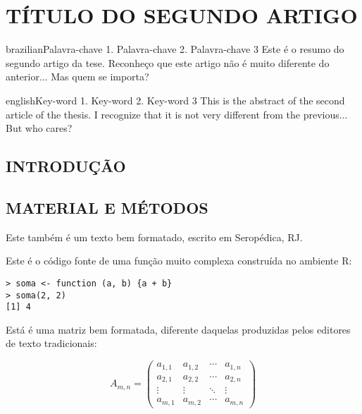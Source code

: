 \artigotrue
\chapter{TÍTULO DO SEGUNDO ARTIGO}
\label{chap:chapter01}

\begin{chapterabstract}{brazilian}{Palavra-chave 1. Palavra-chave 2. Palavra-chave 3}
Este é o resumo do segundo artigo da tese. Reconheço que este artigo não é muito
diferente do anterior... Mas quem se importa?
\end{chapterabstract}

\begin{chapterabstract}{english}{Key-word 1. Key-word 2. Key-word 3}
This is the abstract of the second article of the thesis. I recognize that it is
not very different from the previous... But who cares?
\end{chapterabstract}

\formatchapter

\section{INTRODUÇÃO}

\blindtext[2]

\section{MATERIAL E MÉTODOS}

Este também é um texto bem formatado, escrito em Seropédica, RJ. \blindtext[1]

Este é o código fonte de uma função muito complexa construída no ambiente R:

\begin{verbatim}
> soma <- function (a, b) {a + b}
> soma(2, 2)
[1] 4
\end{verbatim}

Está é uma matriz bem formatada, diferente daquelas produzidas pelos editores de
texto tradicionais:

\begin{equation}
  A_{m,n} =
 \begin{pmatrix}
  a_{1,1} & a_{1,2} & \cdots & a_{1,n} \\
  a_{2,1} & a_{2,2} & \cdots & a_{2,n} \\
  \vdots  & \vdots  & \ddots & \vdots  \\
  a_{m,1} & a_{m,2} & \cdots & a_{m,n}
 \end{pmatrix}
\end{equation}

